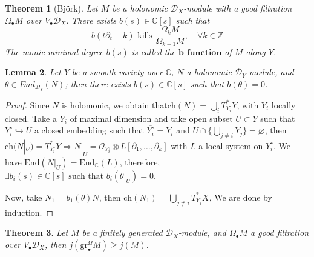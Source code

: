 \documentclass[openany]{book}
\newtheorem{theorem}{Theorem}[chapter] %
\newtheorem{lemma}[theorem]{Lemma}     %
\theoremstyle{definition} %
\theoremstyle{remark}
\begin{document}
\begin{theorem}[Björk]\label{Theorem 8.4}
    Let $M$ be a holonomic $\mathcal{D}_X$-module with a good filtration $\Omega_{\bullet} M$ over $V_{\bullet} \mathcal{D}_X$. There exists $b(s) \in \mathbb{C}[s]$ such that $$b(t\partial_t - k) \text{ kills } \frac{\Omega_k M}{\Omega_{k-1} M}, \quad \forall k \in \mathbb{Z}$$The monic minimal degree $b(s)$ is called the $\textbf{b-function}$ of $M$ along $Y$.
\end{theorem}
\begin{lemma}\label{lemma 8.5}
    Let $Y$ be a smooth variety over $\mathbb{C}$, $N$ a holonomic $\mathcal{D}_Y$-module, and $\theta\in End_{\mathcal{D}_Y}(N)$; then there exists $b(s)\in\mathbb{C}[s]$ such that $b(\theta)=0$.
\end{lemma}
\begin{proof}

    Since $N$ is holomonic, we obtain that$\mathrm{ch}(N) = \bigcup\limits_{i} T^*_{Y_i} Y$, with $Y_{i}$ locally closed. Take a $Y_i$ of maximal dimension and take open subset $U \subset Y$ such that $Y_{i}^{\circ} \hookrightarrow U$ a closed embedding such that $\overline{Y_i^{\circ}} = Y_{i}$ and $U \cap \{\bigcup\limits_{j\neq i}Y_j\} = \varnothing$, then $\mathrm{ch}(N|_U) = T^*_{Y_i^\circ} Y\Rightarrow N|_U = \mathcal{O}_{Y_i^\circ} \otimes L[\partial_1, \ldots, \partial_k]$ with $L$ a local system on $Y_i^\circ$. We have $\mathrm{End}(N|_U) = \mathrm{End}_{\mathbb{C}}(L)$, therefore, $\exists b_i(s) \in \mathbb{C}[s]  \text{ such that } b_i(\theta|_{U}) = 0.$

    Now, take $N_1 = b_1(\theta)N$, then $\mathrm{ch}(N_1) = \bigcup\limits_{j \neq i} T^*_{Y_j} X$, We are done by induction.
\end{proof}
\begin{theorem}\label{Theorem 8.6}
    Let $M$ be a finitely generated $\mathcal{D}_{X}$-module, and $\Omega_{\bullet}M$ a good filtration over $V_{\bullet}\mathcal{D}_{X}$, then $j(\mathrm{gr}_{\bullet}^\Omega M)\ge j(M)$.
\end{theorem}
\end{document}
